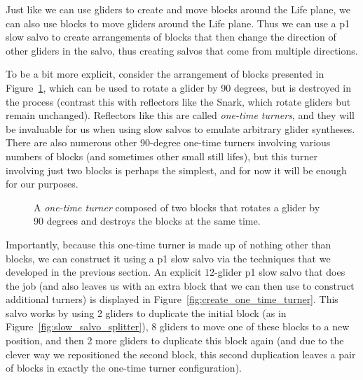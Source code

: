 Just like we can use gliders to create and move blocks around the Life plane, we can also use blocks to move gliders around the Life plane. Thus we can use a p1 slow salvo to create arrangements of blocks that then change the direction of other gliders in the salvo, thus creating salvos that come from multiple directions.

To be a bit more explicit, consider the arrangement of blocks presented in Figure~\ref{fig:one_time_turner}, which can be used to rotate a glider by 90 degrees, but is destroyed in the process (contrast this with reflectors like the Snark, which rotate gliders but remain unchanged). Reflectors like this are called \emph{one-time turners}, and they will be invaluable for us when using slow salvos to emulate arbitrary glider syntheses. There are also numerous other 90-degree one-time turners involving various numbers of blocks (and sometimes other small still lifes), but this turner involving just two blocks is perhaps the simplest, and for now it will be enough for our purposes.

\begin{figure}[!ht]
	\centering{}
	\caption{A \emph{one-time turner} composed of two blocks that rotates a glider by 90 degrees and destroys the blocks at the same time.}\label{fig:one_time_turner}
\end{figure}

Importantly, because this one-time turner is made up of nothing other than blocks, we can construct it using a p1 slow salvo via the techniques that we developed in the previous section. An explicit $12$-glider p1 slow salvo that does the job (and also leaves us with an extra block that we can then use to construct additional turners) is displayed in Figure~\ref{fig:create_one_time_turner}. This salvo works by using 2 gliders to duplicate the initial block (as in Figure~\ref{fig:slow_salvo_splitter}), 8 gliders to move one of these blocks to a new position, and then 2 more gliders to duplicate this block again (and due to the clever way we repositioned the second block, this second duplication leaves a pair of blocks in exactly the one-time turner configuration).

